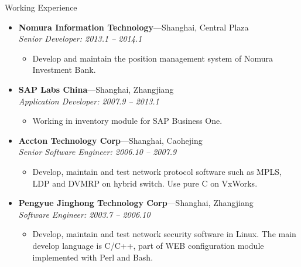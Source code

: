\documentclass[11pt,oneside]{article}
\newenvironment{ressection}[1]{
	\vspace{4pt}
	{\selectfont\Large#1}
	\begin{itemize}
	\vspace{3pt}
}{
	\end{itemize}
}
\newcommand{\ressubitem}[1]{
	\vspace{-1pt}
	\item \begin{flushleft} #1 \end{flushleft}
}
\newcommand{\resbigitem}[3]{
	\vspace{-5pt}
	\item
	\textbf{#1}---#2 \\
	\textit{#3}
}
\newenvironment{ressubsec}[3]{
	\resbigitem{#1}{#2}{#3}
	\vspace{-2pt}
	\begin{itemize}
}{
    \end{itemize}
}
\begin{document}
\begin{ressection}{Working Experience}
	\begin{ressubsec}{Nomura Information Technology}{Shanghai, Central Plaza}{Senior Developer: 2013.1 -- 2014.1}
		\ressubitem{Develop and maintain the position management system of Nomura Investment Bank.}
	\end{ressubsec}

	\begin{ressubsec}{SAP Labs China}{Shanghai, Zhangjiang}{Application Developer: 2007.9 -- 2013.1}
		\ressubitem{Working in inventory module for SAP Business One.}
	\end{ressubsec}

	\begin{ressubsec}{Accton Technology Corp}{Shanghai, Caohejing}{Senior Software Engineer: 2006.10 -- 2007.9}
		\ressubitem{Develop, maintain and test network protocol software such as MPLS, LDP and DVMRP on
			hybrid switch. Use pure C on VxWorks.}
	\end{ressubsec}

	\begin{ressubsec}{Pengyue Jinghong Technology Corp}{Shanghai, Zhangjiang}{Software Engineer: 2003.7 -- 2006.10}
		\ressubitem{Develop, maintain and test network security software in Linux. The main develop
			language is C/C++, part of WEB configuration module implemented with Perl and Bash.}
	\end{ressubsec}

\end{ressection}
\end{document}
